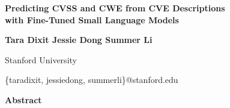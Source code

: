 \documentclass[10pt]{article}
\begin{document}
\thispagestyle{fancy}
\vspace*{0.35in}
\begin{center}
{\Large\bfseries Predicting CVSS and CWE from CVE Descriptions\\with Fine-Tuned Small Language Models\par}
\vspace{0.3in}
{\bfseries Tara Dixit \hspace{0.45in} Jessie Dong \hspace{0.45in} Summer Li\par}
\vspace{6pt}
Stanford University\par
\vspace{2pt}
{\small\ttfamily \{taradixit, jessiedong, summerli\}@stanford.edu\par}
\end{center}
\vspace{0.15in}

\begin{center}{\large\bfseries Abstract}\end{center}
\vspace{-6pt}
\begin{quote}

\end{quote}













\appendix

\end{document}
